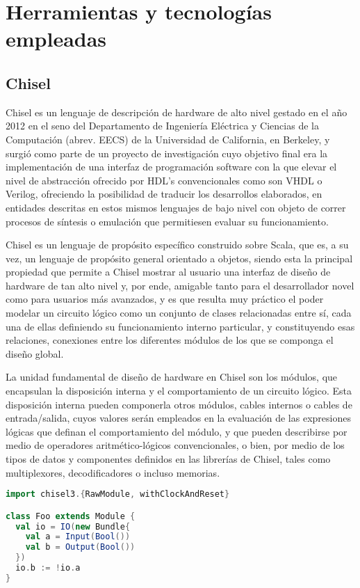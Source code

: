 \chapter{Herramientas y tecnologías empleadas}

\section{Chisel}

Chisel es un lenguaje de descripción de hardware de alto nivel gestado en el año 2012 en el seno del Departamento de Ingeniería Eléctrica y Ciencias de la Computación (abrev. EECS) de la Universidad de California, en Berkeley, y surgió como parte de un proyecto de investigación cuyo objetivo final era la implementación de una interfaz de programación software con la que elevar el nivel de abstracción ofrecido por HDL's convencionales como son VHDL o Verilog, ofreciendo la posibilidad de traducir los desarrollos elaborados, en entidades descritas en estos mismos lenguajes de bajo nivel con objeto de correr procesos de síntesis o emulación que permitiesen evaluar su funcionamiento.

Chisel es un lenguaje de propósito específico construido sobre Scala, que es, a su vez, un lenguaje de propósito general orientado a objetos, siendo esta la principal propiedad que permite a Chisel mostrar al usuario una interfaz de diseño de hardware de tan alto nivel y, por ende, amigable tanto para el desarrollador novel como para usuarios más avanzados, y es que resulta muy práctico el poder modelar un circuito lógico como un conjunto de clases relacionadas entre sí, cada una de ellas definiendo su funcionamiento interno particular, y constituyendo esas relaciones, conexiones entre los diferentes módulos de los que se componga el diseño global.

La unidad fundamental de diseño de hardware en Chisel son los módulos, que encapsulan la disposición interna y el comportamiento de un circuito lógico. Esta disposición interna pueden componerla otros módulos, cables internos o cables de entrada/salida, cuyos valores serán empleados en la evaluación de las expresiones lógicas que definan el comportamiento del módulo, y que pueden describirse por medio de operadores aritmético-lógicos convencionales, o bien, por medio de los tipos de datos y componentes definidos en las librerías de Chisel, tales como multiplexores, decodificadores o incluso memorias.

\begin{lstlisting}[language=Scala]
import chisel3.{RawModule, withClockAndReset}

class Foo extends Module {
  val io = IO(new Bundle{
    val a = Input(Bool())
    val b = Output(Bool())
  })
  io.b := !io.a
}
\end{lstlisting}

